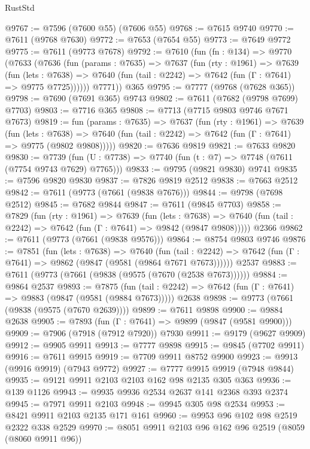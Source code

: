 \begin{lexlean}{RustStd}
\begin{coremodule}
@9767 := @7596 (@7600 @55) (@7606 @55)
@9768 := @7615 @9740
@9770 := @7611 (@9768 @7630)
@9772 := @7653 (@7654 @55)
@9773 := @7649 @9772
@9775 := @7611 (@9773 @7678)
@9792 := @7610
    (fun (fn : @134) =>
    @9770
      (@7633
        (@7636
          (fun (params : @7635) =>
          @7637
            (fun (rty : @1961) =>
            @7639
              (fun (lets : @7638) =>
              @7640 (fun (tail : @2242) => @7642 (fun (Γ : @7641) => @9775 @7725))))))
        @7771))
    @365
@9795 := @7777 (@9768 (@7628 @365))
@9798 := @7690 (@7691 @365) @9743
@9802 := @7611 (@7682 (@9798 @7699) @7703)
@9803 := @7716 @365
@9808 := @7713 (@7715 @9803 @9746 @7671 @7673)
@9819 := fun (params : @7635) =>
  @7637
    (fun (rty : @1961) =>
    @7639
      (fun (lets : @7638) =>
      @7640 (fun (tail : @2242) => @7642 (fun (Γ : @7641) => @9775 (@9802 @9808)))))
@9820 := @7636 @9819
@9821 := @7633 @9820
@9830 := @7739 (fun (U : @7738) => @7740 (fun (t : @7) => @7748 (@7611 (@7754 @9743 @7629) @7765)))
@9833 := @9795 (@9821 @9830) @9741
@9835 := @7596 @9820 @9830
@9837 := @7826 @9819 @2512
@9838 := @7663 @2512
@9842 := @7611 (@9773 (@7661 (@9838 @7676)))
@9844 := @9798 (@7698 @2512)
@9845 := @7682 @9844
@9847 := @7611 (@9845 @7703)
@9858 := @7829
    (fun (rty : @1961) =>
    @7639
      (fun (lets : @7638) =>
      @7640 (fun (tail : @2242) => @7642 (fun (Γ : @7641) => @9842 (@9847 @9808)))))
    @2366
@9862 := @7611 (@9773 (@7661 (@9838 @9576)))
@9864 := @8754 @9803 @9746
@9876 := @7851
    (fun (lets : @7638) =>
    @7640
      (fun (tail : @2242) => @7642 (fun (Γ : @7641) => @9862 (@9847 (@9581 (@9864 @7671 @7673))))))
    @2537
@9883 := @7611 (@9773 (@7661 (@9838 (@9575 (@7670 (@2538 @7673))))))
@9884 := @9864 @2537
@9893 := @7875
    (fun (tail : @2242) => @7642 (fun (Γ : @7641) => @9883 (@9847 (@9581 (@9884 @7673)))))
    @2638
@9898 := @9773 (@7661 (@9838 (@9575 (@7670 @2639))))
@9899 := @7611 @9898
@9900 := @9884 @2638
@9905 := @7893 (fun (Γ : @7641) => @9899 (@9847 (@9581 @9900)))
@9909 := @7906 (@7918 (@7912 @7920)) @7930
@9911 := @9179 (@9627 @9909)
@9912 := @9905 @9911
@9913 := @7777 @9898
@9915 := @9845 (@7702 @9911)
@9916 := @7611 @9915
@9919 := @7709 @9911 @8752 @9900
@9923 := @9913 (@9916 @9919) (@7943 @9772)
@9927 := @7777 @9915 @9919 (@7948 @9844)
@9935 := @9121 @9911 @2103 @2103 @162 @98 @2135 @305 @363
@9936 := @139 @1126
@9943 := @9935 @9936 @2534 @2637 @141 @2368 @393 @2374
@9945 := @7971 @9911 @2103
@9948 := @9945 @305 @98 @2534
@9953 := @8421 @9911 @2103 @2135 @171 @161
@9960 := @9953 @96 @102 @98 @2519 @2322 @338 @2529
@9970 := @8051 @9911 @2103 @96 @162 @96 @2519 (@8059 (@8060 @9911 @96))

\end{coremodule}
\end{lexlean}
